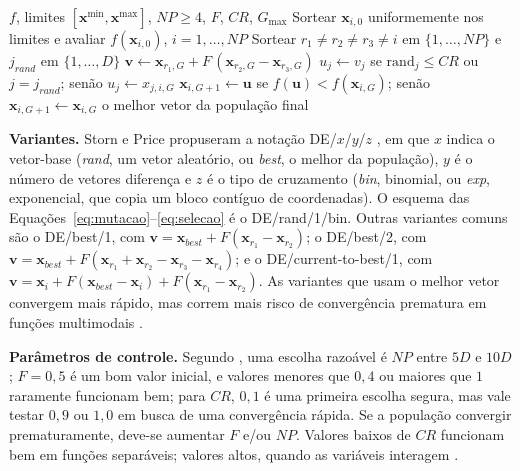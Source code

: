 \documentclass[12pt]{article}
\newcommand{\x}{\mathbf{x}}
\newcommand{\vv}{\mathbf{v}}
\newcommand{\uu}{\mathbf{u}}
\begin{document}
\begin{algorithm}[!tb]
\caption{Evolução Diferencial clássica (DE/rand/1/bin)}\label{alg:de}
\begin{algorithmic}[1]
\Require $f$, limites $[\x^{\min}, \x^{\max}]$, $NP \ge 4$, $F$, $CR$, $G_{\max}$
\State Sortear $\x_{i,0}$ uniformemente nos limites e avaliar $f(\x_{i,0})$, $i = 1,\dots,NP$
    \State Sortear $r_1 \ne r_2 \ne r_3 \ne i$ em $\{1,\dots,NP\}$ e $j_{rand}$ em $\{1,\dots,D\}$
    \State $\vv \gets \x_{r_1,G} + F\,(\x_{r_2,G} - \x_{r_3,G})$ 
    \State $u_j \gets v_j$ se $\mathrm{rand}_j \le CR$ ou $j = j_{rand}$; senão $u_j \gets x_{j,i,G}$ 
    \State $\x_{i,G+1} \gets \uu$ se $f(\uu) < f(\x_{i,G})$; senão $\x_{i,G+1} \gets \x_{i,G}$ 
  \EndFor
\EndFor
\Ensure o melhor vetor da população final
\end{algorithmic}
\end{algorithm}

\textbf{Variantes.} Storn e Price propuseram a notação DE/$x$/$y$/$z$ \cite{storn1997},
em que $x$ indica o vetor-base (\emph{rand}, um vetor aleatório, ou
\emph{best}, o melhor da população), $y$ é o número de vetores diferença e $z$ é
o tipo de cruzamento (\emph{bin}, binomial, ou \emph{exp}, exponencial, que
copia um bloco contíguo de coordenadas). O esquema das
Equações~\ref{eq:mutacao}--\ref{eq:selecao} é o DE/rand/1/bin. Outras
variantes comuns são o DE/best/1, com
$\vv = \x_{best} + F(\x_{r_1} - \x_{r_2})$; o DE/best/2, com
$\vv = \x_{best} + F(\x_{r_1} + \x_{r_2} - \x_{r_3} - \x_{r_4})$; e o
DE/current-to-best/1, com
$\vv = \x_i + F(\x_{best} - \x_i) + F(\x_{r_1} - \x_{r_2})$. As variantes que
usam o melhor vetor convergem mais rápido, mas correm mais risco de
convergência prematura em funções multimodais \cite{das2011}.

\textbf{Parâmetros de controle.} Segundo \cite{storn1997}, uma escolha
razoável é $NP$ entre $5D$ e $10D$; $F = 0{,}5$ é um bom valor inicial, e
valores menores que $0{,}4$ ou maiores que $1$ raramente funcionam bem; para
$CR$, $0{,}1$ é uma primeira escolha segura, mas vale testar $0{,}9$ ou $1{,}0$
em busca de uma convergência rápida. Se a população convergir prematuramente,
deve-se aumentar $F$ e/ou $NP$. Valores baixos de $CR$ funcionam bem em funções
separáveis; valores altos, quando as variáveis interagem \cite{das2011}.
\end{document}
